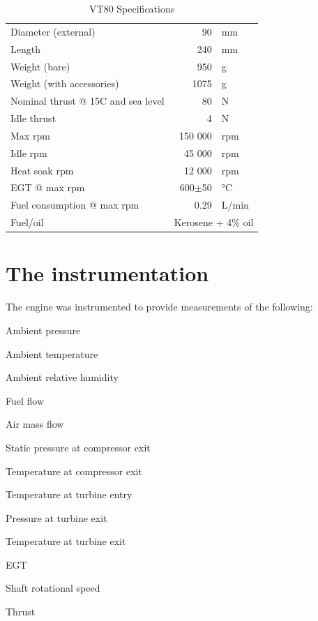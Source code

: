 \documentclass[tcc]{subfiles}
\begin{document}
\begin{table}
    \centering
    \caption{VT80 Specifications}
    \label{tbl:engine_specs}
    \begin{tabular}{lr@{$\,$}l}
        \toprule
        Diameter (external)                & 90 & mm \\
        Length                             & 240 & mm \\
        Weight (bare)                      & 950 & g \\
        Weight (with accessories)          & 1075 & g \\
        Nominal thrust @ 15C and sea level & 80 & N \\
        Idle thrust                        & 4 & N \\
        Max rpm                            & 150 000 & rpm \\
        Idle rpm                           & 45 000  & rpm \\
        Heat soak rpm                      & 12 000  & rpm \\
        \acs{EGT} @ max rpm                & 600$\pm$50 & \si{\celsius} \\
        Fuel consumption @ max rpm         & 0.29 & L/min \\
        Fuel/oil                   &\multicolumn{2}{l}{Kerosene + 4\% oil} \\
        \bottomrule
    \end{tabular}
\end{table}

\section{The instrumentation}
The engine was instrumented to provide measurements of the following:
\begin{compactitem}
    \item Ambient pressure
    \item Ambient temperature
    \item Ambient relative humidity
    \item Fuel flow
    \item Air mass flow
    \item Static pressure at compressor exit
    \item Temperature at compressor exit
    \item Temperature at turbine entry
    \item Pressure at turbine exit
    \item Temperature at turbine exit
    \item \gls{EGT}
    \item Shaft rotational speed
    \item Thrust
\end{compactitem}
\end{document}
